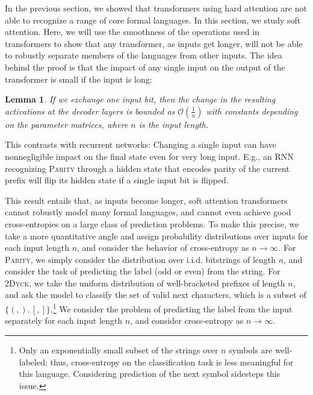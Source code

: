 \documentclass[11pt,a4paper]{article}
\newcounter{theorem}
\newtheorem{lemma}[theorem]{Lemma}
\begin{document}
In the previous section, we showed that transformers using hard attention are not able to recognize a range of core formal languages.
In this section, we study soft attention. %
Here, we will use the smoothness of the operations used in transformers to show that any transformer, as inputs get longer, will not be able to robustly separate members of the languages from other inputs.
The idea behind the proof is that the impact of any single input on the output of the transformer is small if the input is long:
\begin{lemma}
If we exchange one input bit, %
then the change in the resulting activations at the decoder layers is bounded as $\mathcal{O}(\frac{1}{n})$ with constants depending on the parameter matrices, where $n$ is the input length. %
\end{lemma}
This contrasts with recurrent networks:
Changing a single input can have nonnegligible impact on the final state even for very long input.
E.g., an RNN recognizing \textsc{Parity} through a hidden state that encodes parity of the current prefix will flip its hidden state if a single input bit is flipped.


This result entails that, as inputs become longer, soft attention transformers cannot robustly model many formal languages, and cannot even achieve good cross-entropies on a large class of prediction problems.
To make this precise, we take a more quantitative angle and assign probability distributions over inputs for each input length $n$, and consider the behavior of cross-entropy as $n\rightarrow\infty$.
For \textsc{Parity}, we simply consider the distribution over i.i.d. bitstrings of length $n$, and consider the task of predicting the label (odd or even) from the string.
For \textsc{2Dyck}, we take the uniform distribution of well-bracketed prefixes of length $n$, and ask the model to classify the set of valid next characters, which is a subset of $\{(,),[, ]\}$.\footnote{Only an exponentially small subset of the strings over $n$ symbols are well-labeled; thus, cross-entropy on the classification task is less meaningful for this language. Considering prediction of the next symbol sidesteps this issue.}
We consider the problem of predicting the label from the input separately for each input length $n$, and consider cross-entropy as $n\rightarrow \infty$.
\end{document}
